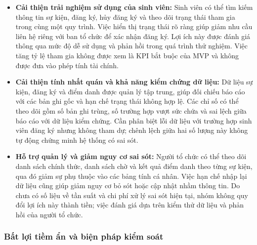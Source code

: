 
\begin{itemize}
    \item \textbf{Cải thiện trải nghiệm sử dụng của sinh viên:} Sinh viên có thể tìm kiếm thông tin sự kiện, đăng ký, hủy đăng ký và theo dõi trạng thái tham gia trong cùng một quy trình. Việc hiển thị trạng thái rõ ràng giúp giảm nhu cầu liên hệ riêng với ban tổ chức để xác nhận đăng ký. Lợi ích này được đánh giá thông qua mức độ dễ sử dụng và phản hồi trong quá trình thử nghiệm. Việc tăng tỷ lệ tham gia không được xem là KPI bắt buộc của MVP và không được đưa vào phép tính tài chính.

    \item \textbf{Cải thiện tính nhất quán và khả năng kiểm chứng dữ liệu:} Dữ liệu sự kiện, đăng ký và điểm danh được quản lý tập trung, giúp đối chiếu báo cáo với các bản ghi gốc và hạn chế trạng thái không hợp lệ. Các chỉ số có thể theo dõi gồm số bản ghi trùng, số trường hợp vượt sức chứa và sai lệch giữa báo cáo với dữ liệu kiểm chứng. Cần phân biệt lỗi dữ liệu với trường hợp sinh viên đăng ký nhưng không tham dự; chênh lệch giữa hai số lượng này không tự động chứng minh hệ thống có sai sót.

    \item \textbf{Hỗ trợ quản lý và giảm nguy cơ sai sót:} Người tổ chức có thể theo dõi danh sách chính thức, danh sách chờ và kết quả điểm danh theo từng sự kiện, qua đó giảm sự phụ thuộc vào các bảng tính cá nhân. Việc hạn chế nhập lại dữ liệu cũng giúp giảm nguy cơ bỏ sót hoặc cập nhật nhầm thông tin. Do chưa có số liệu về tần suất và chi phí xử lý sai sót hiện tại, nhóm không quy đổi lợi ích này thành tiền; việc đánh giá dựa trên kiểm thử dữ liệu và phản hồi của người tổ chức.
\end{itemize}

\subsubsection{Bất lợi tiềm ẩn và biện pháp kiểm soát}

